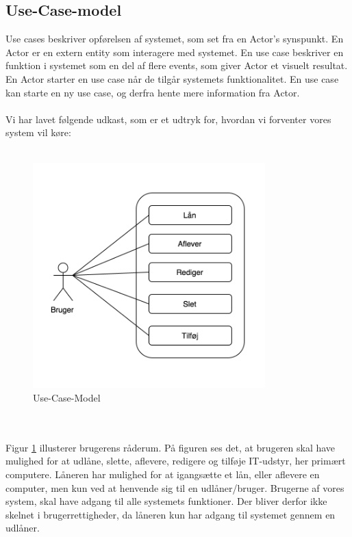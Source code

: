 \documentclass[a4paper]{article}
\begin{document}
\subsection{Use-Case-model}
Use cases beskriver opførelsen af systemet, som set fra en Actor’s synspunkt. En Actor er en extern entity som interagere med systemet. En use case beskriver en funktion i systemet som en del af flere events, som giver Actor et visuelt resultat. En Actor starter en use case når de tilgår systemets funktionalitet. En use case kan starte en ny use case, og derfra hente mere information fra Actor.\cite[p~42]{OOSE} \\ \\
Vi har lavet følgende udkast, som er et udtryk for, hvordan vi forventer vores system vil køre:\\ \\
\begin{figure}[h!]
\includegraphics[width=0.8\textwidth]{UseCase}
  \caption{Use-Case-Model}
  \label{fig:USM}
  \centering
\end{figure}  \\ \\
Figur \ref{fig:USM} illusterer brugerens råderum. På figuren ses det, at brugeren skal have mulighed for at udlåne, slette, aflevere, redigere og tilføje IT-udstyr, her primært computere. Låneren har mulighed for at igangsætte et lån, eller aflevere en computer, men kun ved at henvende sig til en udlåner/bruger. Brugerne af vores system, skal have adgang til alle systemets funktioner. Der bliver derfor ikke skelnet i brugerrettigheder, da låneren kun har adgang til systemet gennem en udlåner.
\newpage
\end{document}
